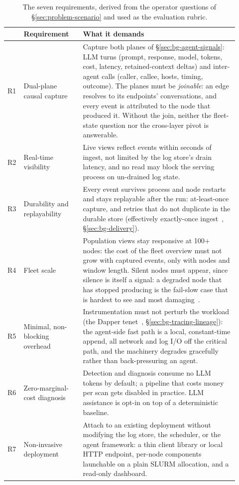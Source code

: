 \begin{table}[h]
\centering
\small
\begin{tabular}{@{}p{0.045\linewidth}p{0.24\linewidth}p{0.63\linewidth}@{}}
\toprule
& \textbf{Requirement} & \textbf{What it demands} \\
\midrule
R1 & Dual-plane causal capture &
  Capture both planes of \S\ref{sec:bg-agent-signals}: LLM turns (prompt,
  response, model, tokens, cost, latency, retained-context deltas) and
  inter-agent calls (caller, callee, hosts, timing, outcome). The planes
  must be \emph{joinable}: an edge resolves to its endpoints'
  conversations, and every event is attributed to the node that produced
  it. Without the join, neither the fleet-state question nor the
  cross-layer pivot is answerable. \\
R2 & Real-time visibility &
  Live views reflect events within seconds of ingest, not limited by the
  log store's drain latency, and no read may block the serving process on
  un-drained log state. \\
R3 & Durability and replayability &
  Every event survives process and node restarts and stays replayable after
  the run: at-least-once capture, and retries that do not duplicate in the
  durable store (effectively exactly-once
  ingest~\cite{kleppmann2017ddia}, \S\ref{sec:bg-delivery}). \\
R4 & Fleet scale &
  Population views stay responsive at 100+ nodes: the cost of the fleet
  overview must not grow with captured events, only with nodes and window
  length. Silent nodes must appear, since silence is itself a signal: a
  degraded node that has stopped producing is the fail-slow case that is
  hardest to see and most damaging~\cite{gunawi2018failslow}. \\
R5 & Minimal, non-blocking overhead &
  Instrumentation must not perturb the workload (the Dapper
  tenet~\cite{sigelman2010dapper},
  \S\ref{sec:bg-tracing-lineage}): the agent-side fast path is a local,
  constant-time append, all network and log I/O off the critical path, and
  the machinery degrades gracefully rather than back-pressuring an agent. \\
R6 & Zero-marginal-cost diagnosis &
  Detection and diagnosis consume no LLM tokens by default; a pipeline that
  costs money per scan gets disabled in practice. LLM assistance is opt-in
  on top of a deterministic baseline. \\
R7 & Non-invasive deployment &
  Attach to an existing deployment without modifying the log store, the
  scheduler, or the agent framework: a thin client library or local HTTP
  endpoint, per-node components launchable on a plain SLURM allocation, and
  a read-only dashboard. \\
\bottomrule
\end{tabular}
\caption[The seven requirements R1--R7]{The seven requirements, derived from
the operator questions of \S\ref{sec:problem-scenario} and used as the
evaluation rubric.}
\label{tab:requirements}
\end{table}


